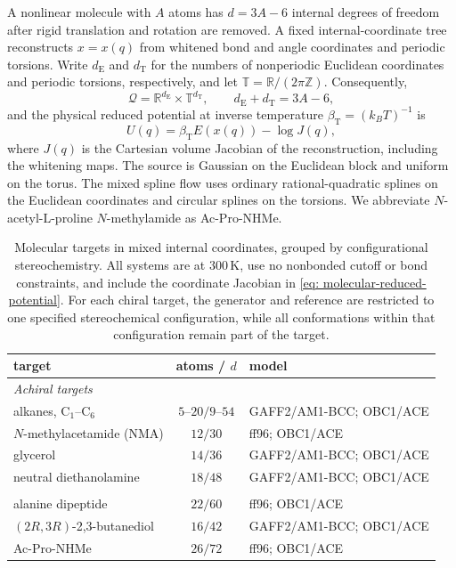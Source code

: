 \documentclass{article}
\begin{document}
A nonlinear molecule with \(A\) atoms has \(d=3A-6\) internal degrees of freedom after rigid translation and rotation are removed. A fixed internal-coordinate tree reconstructs \(x=x(q)\) from whitened bond and angle coordinates and periodic torsions. Write $d_{\mathrm E}$ and $d_{\mathrm T}$ for the numbers of nonperiodic Euclidean coordinates and periodic torsions, respectively, and let $\mathbb T=\mathbb R/(2\pi\mathbb Z)$. Consequently,
\begin{equation}
\mathcal Q=\mathbb R^{d_{\mathrm E}}\times\mathbb T^{d_{\mathrm T}},
\qquad d_{\mathrm E}+d_{\mathrm T}=3A-6,
\label{eq: mixed-molecular-domain}
\end{equation}
and the physical reduced potential at inverse temperature \(\beta_{\mathrm T}=(k_BT)^{-1}\) is
\begin{equation}
U(q)=\beta_{\mathrm T} E(x(q))-\log J(q),
\label{eq: molecular-reduced-potential}
\end{equation}
where \(J(q)\) is the Cartesian volume Jacobian of the reconstruction, including the whitening maps. The source is Gaussian on the Euclidean block and uniform on the torus. The mixed spline flow uses ordinary rational-quadratic splines on the Euclidean coordinates and circular splines on the torsions. We abbreviate \(N\)-acetyl-\(\mathrm L\)-proline \(N\)-methylamide as Ac-Pro-NHMe.

\begin{table}[htb]
\centering
\begin{tabular}{lcl}
\toprule
target & atoms / \(d\) & model \\
\midrule
\multicolumn{3}{l}{\emph{Achiral targets}} \\
\addlinespace[2pt]
alkanes, \(\mathrm C_1\)--\(\mathrm C_6\)
& \(5\text{--}20/9\text{--}54\)
& GAFF2/AM1-BCC; OBC1/ACE \\
\(N\)-methylacetamide (NMA)
& \(12/30\)
& ff96; OBC1/ACE \\
glycerol
& \(14/36\)
& GAFF2/AM1-BCC; OBC1/ACE \\
neutral diethanolamine
& \(18/48\)
& GAFF2/AM1-BCC; OBC1/ACE \\
\addlinespace
\multicolumn{3}{l}{\emph{Chiral targets: one fixed stereochemical configuration}} \\
\addlinespace[2pt]
alanine dipeptide
& \(22/60\)
& ff96; OBC1/ACE \\
\((2R,3R)\)-2,3-butanediol
& \(16/42\)
& GAFF2/AM1-BCC; OBC1/ACE \\
Ac-Pro-NHMe
& \(26/72\)
& ff96; OBC1/ACE \\
\bottomrule
\end{tabular}
\caption{Molecular targets in mixed internal coordinates, grouped by configurational stereochemistry. All systems are at \(300\,\mathrm K\), use no nonbonded cutoff or bond constraints, and include the coordinate Jacobian in \eqref{eq: molecular-reduced-potential}. For each chiral target, the generator and reference are restricted to one specified stereochemical configuration, while all conformations within that configuration remain part of the target.}
\label{tab: molecular-targets}
\end{table}
\end{document}
